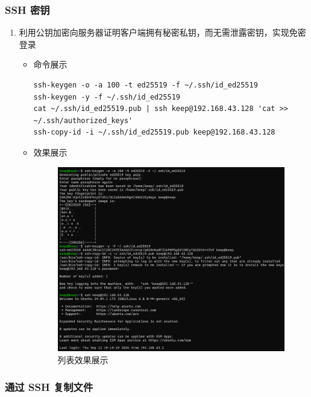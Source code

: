 \documentclass[UTF8]{ctexart}
\begin{document}
\subsubsection{SSH 密钥}

\begin{enumerate}
  \item 利用公钥加密向服务器证明客户端拥有秘密私钥，而无需泄露密钥，实现免密登录
  \begin{itemize}
  \item 命令展示
  \begin{verbatim}
ssh-keygen -o -a 100 -t ed25519 -f ~/.ssh/id_ed25519
ssh-keygen -y -f ~/.ssh/id_ed25519
cat ~/.ssh/id_ed25519.pub | ssh keep@192.168.43.128 'cat >> ~/.ssh/authorized_keys'
ssh-copy-id -i ~/.ssh/id_ed25519.pub keep@192.168.43.128

  \end{verbatim}
\item 效果展示
  \begin{figure}[H]
    \centering
    \includegraphics[width=\textwidth]{1116} %
    \caption{列表效果展示}
  \end{figure}
  \end{itemize}
\end{enumerate}

\subsubsection{通过 SSH 复制文件}
\end{document}
